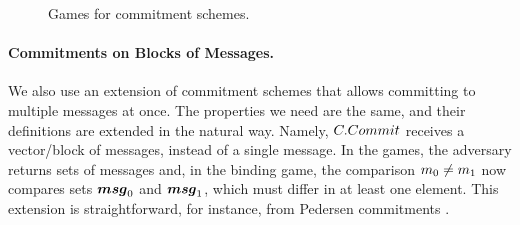\begin{figure}[ht!]
  \label{fig:com-games}
  \caption{Games for commitment schemes.}
\end{figure}

\paragraph{Commitments on Blocks of Messages.} We also use an extension
of commitment schemes that allows committing to multiple messages at once. The
properties we need are the same, and their definitions are extended in the
natural way. Namely, $C.Commit$ receives a vector/block of messages, \msgset
instead of a single message. In the games, the adversary returns sets of
messages and, in the binding game, the comparison $m_0 \neq m_1$ now
compares sets $\boldsymbol{msg}_0$ and $\boldsymbol{msg}_1$, which must differ in at least one
element. This extension is straightforward, for instance, from Pedersen
commitments \cite{bcc+15}.

